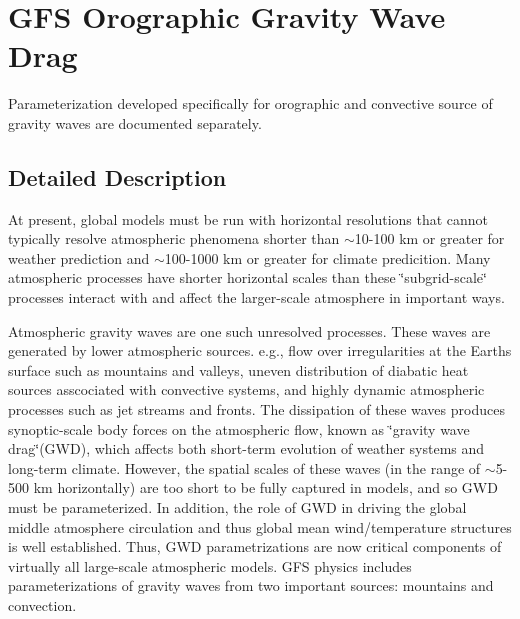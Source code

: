 \hypertarget{group___g_f_s__gwd}{}\section{G\+FS Orographic Gravity Wave Drag}
\label{group___g_f_s__gwd}


Parameterization developed specifically for orographic and convective source of gravity waves are documented separately.  




\subsection{Detailed Description}
At present, global models must be run with horizontal resolutions that cannot typically resolve atmospheric phenomena shorter than $\sim$10-\/100 km or greater for weather prediction and $\sim$100-\/1000 km or greater for climate predicition. Many atmospheric processes have shorter horizontal scales than these \char`\"{}subgrid-\/scale\char`\"{} processes interact with and affect the larger-\/scale atmosphere in important ways.

Atmospheric gravity waves are one such unresolved processes. These waves are generated by lower atmospheric sources. e.\+g., flow over irregularities at the Earth\textquotesingle{}s surface such as mountains and valleys, uneven distribution of diabatic heat sources asscociated with convective systems, and highly dynamic atmospheric processes such as jet streams and fronts. The dissipation of these waves produces synoptic-\/scale body forces on the atmospheric flow, known as \char`\"{}gravity wave drag\char`\"{}(G\+WD), which affects both short-\/term evolution of weather systems and long-\/term climate. However, the spatial scales of these waves (in the range of $\sim$5-\/500 km horizontally) are too short to be fully captured in models, and so G\+WD must be parameterized. In addition, the role of G\+WD in driving the global middle atmosphere circulation and thus global mean wind/temperature structures is well established. Thus, G\+WD parametrizations are now critical components of virtually all large-\/scale atmospheric models. G\+FS physics includes parameterizations of gravity waves from two important sources\+: mountains and convection.

